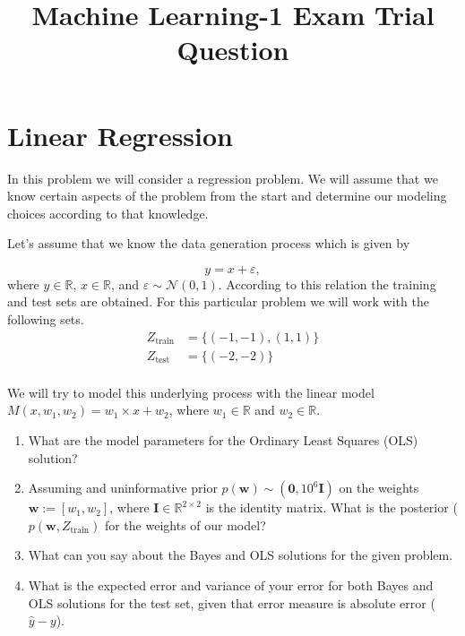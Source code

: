 \documentclass{tran-l}
\title{Machine Learning-1 Exam Trial Question}
\theoremstyle{remark}
\numberwithin{equation}{section}
\newcommand{\mR}{\mathbb{R}}
\begin{document}
\maketitle

\section{Linear Regression}

\qu In this problem we will consider a regression problem. We will assume that we know certain aspects of the problem from the start and determine our modeling choices according to that knowledge. 

Let's assume that we know the data generation process which is given by

\begin{equation*}
  y=x+\varepsilon,
\end{equation*}
where $y\in\mR$, $x\in\mR$, and $\varepsilon\sim\mathcal{N}(0,1)$. According to this relation the training and test sets are obtained. For this particular problem we will work with the following sets.
\begin{align*}
  Z_{\text{train}} &= \{(-1,-1), (1,1)\} \\
  Z_{\text{test}} &= \{(-2,-2)\} \\
\end{align*}

We will try to model this underlying process with the linear model $M(x,w_1,w_2) = w_1\times x+w_2$, where $w_1\in\mR$ and $w_2\in\mR$.

\begin{enumerate}[label=\alph*]
\item What are the model parameters for the Ordinary Least Squares (OLS) solution?
\item Assuming and uninformative prior $p(\mathbf{w})\sim(\mathbf{0},10^{6} \mathbf{I})$ on the weights $\mathbf{w}:=[w_1, w_2]$, where $\mathbf{I}\in\mR^{2\times 2}$ is the identity matrix. What is the posterior ($p(\mathbf{w},Z_{\text{train}})$ for the weights of our model? 
\item What can you say about the Bayes and OLS solutions for the given problem. 
\item What is the expected error and variance of your error for both Bayes and OLS solutions for the test set, given that error measure is absolute error ($\hat{y}-y$). 

\end{enumerate}
\end{document}
